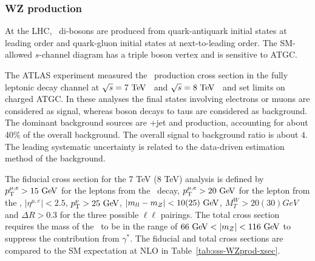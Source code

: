 \subsubsection{WZ production}

\label{sss-WZprod}

At the LHC, \WZ\ di-bosons are produced from quark-antiquark initial states at 
leading order and quark-gluon initial states at next-to-leading order. %
The SM-allowed $s$-channel diagram has a triple boson vertex and is sensitive to 
ATGC.





The ATLAS experiment measured the \WZ\ production cross section in the fully 
leptonic decay channel \ll\lnu\; at $\rts = 7\TeV$~\cite{Aad:2012twa} and $\rts = 8\TeV$~\cite{Aad:2016ett} 
and set limits on charged ATGC.
In these analyses the final states involving electrons or muons are considered as signal,
whereas boson decays to taus are considered as background.  
The dominant background sources are \Zboson+jet and \ZZ production, accounting for about 40\% of 
the overall background. The overall signal to background ratio is about $4$.
The leading systematic uncertainty is related to the data-driven estimation method of the   
background.%

The fiducial cross section for the 7 TeV (8 TeV) analysis is defined by $\pt^{\mu,e} > 15\GeV$ for the leptons from the \Zboson\ 
 decay, $\pt^{\mu,e} > 20\GeV$ for the lepton from the \Wboson, $|\eta^{\mu,e}|<2.5$, $\pt^\nu>25\GeV$,
 $|m_{ll}-m_Z| < 10(25)\GeV$, $M_T^W>20(30)GeV$ and $\Delta R> 0.3$ for the three possible $\ell\ell$ pairings. 
The total cross section requires the mass of the \Zboson\ to be in the range of $66\GeV < |m_Z| < 116\GeV$
to suppress the contribution from $\gamma^*$.
The fiducial and total cross sections are compared to the SM expectation at NLO in Table~\ref{tab:sss-WZprod-xsec}.

